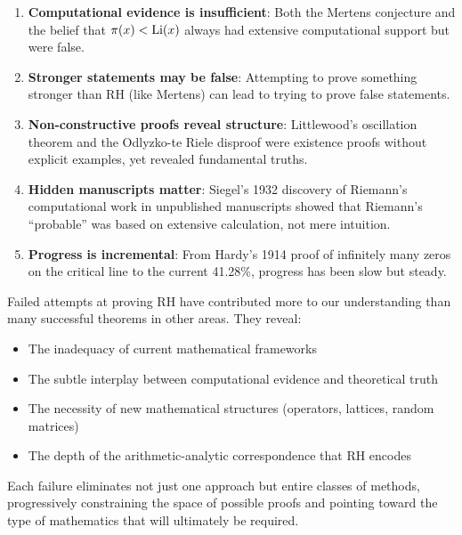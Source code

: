 \begin{assessment}
\begin{enumerate}
\item \textbf{Computational evidence is insufficient}: Both the Mertens conjecture and the belief that $\pi(x) < \operatorname{Li}(x)$ always had extensive computational support but were false.

\item \textbf{Stronger statements may be false}: Attempting to prove something stronger than RH (like Mertens) can lead to trying to prove false statements.

\item \textbf{Non-constructive proofs reveal structure}: Littlewood's oscillation theorem and the Odlyzko-te Riele disproof were existence proofs without explicit examples, yet revealed fundamental truths.

\item \textbf{Hidden manuscripts matter}: Siegel's 1932 discovery of Riemann's computational work in unpublished manuscripts showed that Riemann's ``probable'' was based on extensive calculation, not mere intuition.

\item \textbf{Progress is incremental}: From Hardy's 1914 proof \cite{hardy1914} of infinitely many zeros on the critical line to the current 41.28\%, progress has been slow but steady.
\end{enumerate}
\end{assessment}

\begin{philosophical}
Failed attempts at proving RH have contributed more to our understanding than many successful theorems in other areas. They reveal:
\begin{itemize}
\item The inadequacy of current mathematical frameworks
\item The subtle interplay between computational evidence and theoretical truth
\item The necessity of new mathematical structures (operators, lattices, random matrices)
\item The depth of the arithmetic-analytic correspondence that RH encodes
\end{itemize}
Each failure eliminates not just one approach but entire classes of methods, progressively constraining the space of possible proofs and pointing toward the type of mathematics that will ultimately be required.
\end{philosophical}